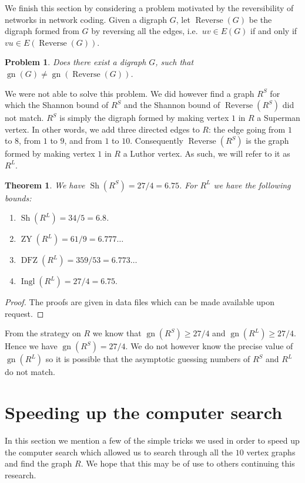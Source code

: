 \documentclass[a4paper, 14pt]{extarticle}
\theoremstyle{plain}
\newtheorem{theorem}[proposition]{Theorem}
\newtheorem{problem}[proposition]{Problem}
\DeclareMathOperator{\gn}{gn}
\DeclareMathOperator{\Reverse}{Reverse}
\DeclareMathOperator{\Sh}{Sh}
\DeclareMathOperator{\ZY}{ZY}
\DeclareMathOperator{\DFZ}{DFZ}
\DeclareMathOperator{\Ingl}{Ingl}
\begin{document}
We finish this section by considering a problem motivated by the
reversibility of networks in network coding. Given a digraph $G$,
let $\Reverse(G)$ be the digraph formed from $G$ by reversing all
the edges, i.e.\ $uv\in E(G)$ if and only if $vu\in E(\Reverse(G))$.

\begin{problem}\label{Prob:Reverse}
Does there exist a digraph $G$, such that $\gn(G)\neq
\gn(\Reverse(G))$.
\end{problem}

We were not able to solve this problem. We did however find a graph
$R^S$ for which the Shannon bound of $R^S$ and the Shannon bound of
$\Reverse(R^S)$ did not match. $R^S$ is simply the digraph formed by
making vertex $1$ in $R$ a Superman vertex. In other words, we add
three directed edges to $R$: the edge going from $1$ to $8$, from
$1$ to $9$, and from $1$ to $10$. Consequently $\Reverse(R^S)$ is
the graph formed by making vertex $1$ in $R$ a Luthor vertex. As
such, we will refer to it as $R^L$.

\begin{theorem}\label{Thm:RSandRL}
We have $\Sh(R^S) = 27/4 = 6.75$. For $R^L$ we have the following bounds:
\begin{enumerate}
\item $\Sh(R^L) = 34/5 = 6.8$.
\item $\ZY(R^L) = 61/9 = 6.777\ldots$
\item $\DFZ(R^L) = 359/53 = 6.773\ldots$
\item $\Ingl(R^L) = 27/4 = 6.75.$
\end{enumerate}
\end{theorem}

\begin{proof}
The proofs are given in data files which can be made available upon
request.
\end{proof}

From the strategy on $R$ we know that $\gn(R^S)\geq 27/4$ and
$\gn(R^L)\geq 27/4$. Hence we have $\gn(R^S)=27/4$. We do not
however know the precise value of $\gn(R^L)$ so it is possible that the
asymptotic guessing numbers of $R^S$ and $R^L$ do not match.

\section{Speeding up the computer search}\label{Sec:Speed}

In this section we mention a few of the simple tricks we used in order to
speed up the computer search which allowed us to search through all
the $10$ vertex graphs and find the graph $R$. We hope that this may
be of use to others continuing this research.
\end{document}
